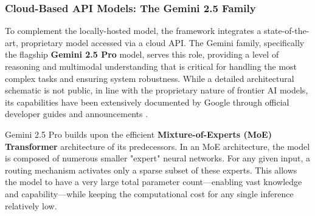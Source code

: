 \subsubsection{Cloud-Based API Models: The Gemini 2.5 Family}

To complement the locally-hosted model, the framework integrates a state-of-the-art, proprietary model accessed via a cloud API. The Gemini family, specifically the flagship \textbf{Gemini 2.5 Pro} model, serves this role, providing a level of reasoning and multimodal understanding that is critical for handling the most complex tasks and ensuring system robustness. While a detailed architectural schematic is not public, in line with the proprietary nature of frontier AI models, its capabilities have been extensively documented by Google through official developer guides and announcements \cite{FIND_CITATION_PLEASE}.

Gemini 2.5 Pro builds upon the efficient \textbf{Mixture-of-Experts (MoE) Transformer} architecture of its predecessors. In an MoE architecture, the model is composed of numerous smaller "expert" neural networks. For any given input, a routing mechanism activates only a sparse subset of these experts. This allows the model to have a very large total parameter count—enabling vast knowledge and capability—while keeping the computational cost for any single inference relatively low.

